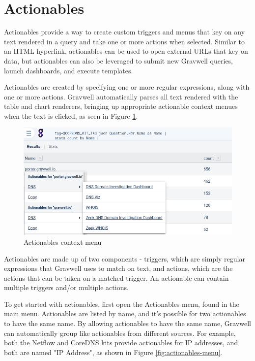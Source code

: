 \section{Actionables}
\label{sec:actionables}
Actionables provide a way to create custom triggers and menus that key on any text rendered in a query and take one or more actions when selected. Similar to an HTML hyperlink, actionables can be used to open external URLs that key on data, but actionables can also be leveraged to submit new Gravwell queries, launch dashboards, and execute templates.

Actionables are created by specifying one or more regular expressions, along with one or more actions. Gravwell automatically parses all text rendered with the table and chart renderers, bringing up appropriate actionable context menues when the text is clicked, as seen in Figure \ref{fig:actionables-overview}.

\begin{figure}
	\includegraphics[width=0.7\linewidth]{images/actionables-overview.png}
	\caption{Actionables context menu}
	\label{fig:actionables-overview}
\end{figure}

Actionables are made up of two components - triggers, which are simply regular expressions that Gravwell uses to match on text, and actions, which are the actions that can be taken on a matched trigger. An actionable can contain multiple triggers and/or multiple actions.

To get started with actionables, first open the Actionables menu, found in the main menu. Actionables are listed by name, and it's possible for two actionables to have the same name. By allowing actionables to have the same name, Gravwell can automatically group like actionables from different sources. For example, both the Netflow and CoreDNS kits provide actionables for IP addresses, and both are named "IP Address", as shown in Figure \ref{fig:actionables-menu}.

